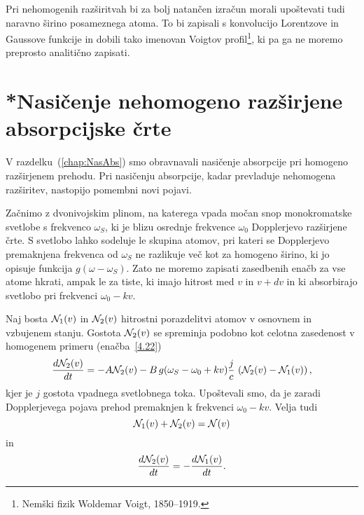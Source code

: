 \begin{remark}
Pri nehomogenih razširitvah bi za bolj natančen izračun morali upoštevati 
tudi naravno širino posameznega atoma. To bi zapisali s konvolucijo Lorentzove
in Gaussove funkcije in dobili tako imenovan Voigtov 
profil\footnote{Nemški fizik Woldemar Voigt, 1850--1919.}, ki pa ga ne moremo 
preprosto analitično zapisati.
\end{remark}

\section{*Nasičenje nehomogeno razširjene absorpcijske črte}
V razdelku~(\ref{chap:NasAbs}) smo obravnavali nasičenje absorpcije pri homogeno 
razširjenem prehodu. Pri nasičenju absorpcije, kadar prevladuje nehomogena razširitev,
nastopijo pomembni novi pojavi.

Začnimo z dvonivojskim plinom, na katerega 
vpada močan snop monokromatske svetlobe s frekvenco $\omega_S$,
ki je blizu osrednje frekvence $\omega_{0}$ Dopplerjevo razširjene 
črte. S svetlobo
lahko sodeluje le skupina atomov, pri kateri se Dopplerjevo premaknjena
frekvenca od $\omega_S$ ne razlikuje več kot za homogeno širino, ki
jo opisuje funkcija $g(\omega-\omega_S)$. Zato ne moremo zapisati zasedbenih
enačb za vse atome hkrati, ampak le za tiste, ki imajo hitrost med
$v$ in $v+dv$ in ki absorbirajo svetlobo pri frekvenci $\omega_{0}-kv$.

Naj bosta ${\cal N}_{1}(v)$ in ${\cal N}_{2}(v)$ hitrostni porazdelitvi
atomov v osnovnem in vzbujenem stanju. Gostota
${\cal N}_{2}(v)$ se spreminja podobno kot celotna
zasedenost v homogenem primeru (enačba~\ref{4.22})
\begin{equation}
\frac{d{\cal N}_{2}(v)}{dt}=-A{\cal N}_{2}(v) -B\, g(\omega_S-\omega_{0}+kv)
\frac{j}{c}\,
\left({\cal N}_{2}(v)-{\cal N}_{1}(v)\right),
\label{4.85}
\end{equation}
 kjer je $j$ gostota vpadnega svetlobnega toka. Upoštevali
smo, da je zaradi Dopplerjevega pojava prehod premaknjen k frekvenci
$\omega_{0}-kv$. Velja tudi
\begin{equation}
{\cal N}_{1}(v)+{\cal N}_{2}(v)={\cal N}(v)
\end{equation}
in 
\begin{equation}
 \frac{d{\cal N}_{2}(v)}{dt}=-\frac{d{\cal N}_{1}(v)}{dt}.
\label{4.86}
\end{equation}

